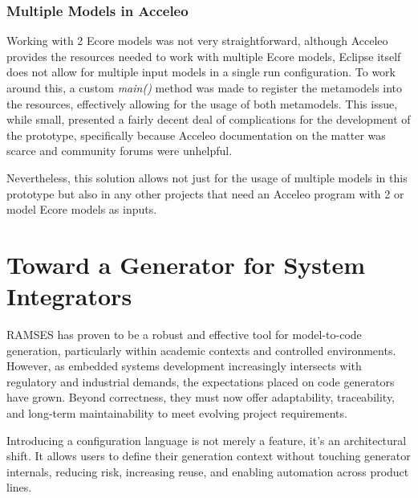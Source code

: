 \subsubsection{Multiple Models in Acceleo}

Working with 2 Ecore models was not very straightforward, although Acceleo provides the resources needed to work with multiple Ecore models, Eclipse itself does not allow for multiple input models in a single run configuration. To work around this, a custom \textit{main()} method was made to register the metamodels into the resources, effectively allowing for the usage of both metamodels. This issue, while small, presented a fairly decent deal of complications for the development of the prototype, specifically because Acceleo documentation on the matter was scarce and community forums were unhelpful.

Nevertheless, this solution allows not just for the usage of multiple models in this prototype but also in any other projects that need an Acceleo program with 2 or model Ecore models as inputs.


\section{Toward a Generator for System Integrators}
\label{sec:conclusion_configurable_generation}

RAMSES has proven to be a robust and effective tool for model-to-code generation, particularly within academic contexts and controlled environments. However, as embedded systems development increasingly intersects with regulatory and industrial demands, the expectations placed on code generators have grown. Beyond correctness, they must now offer adaptability, traceability, and long-term maintainability to meet evolving project requirements.

Introducing a configuration language is not merely a feature, it's an architectural shift. It allows users to define their generation context without touching generator internals, reducing risk, increasing reuse, and enabling automation across product lines.












